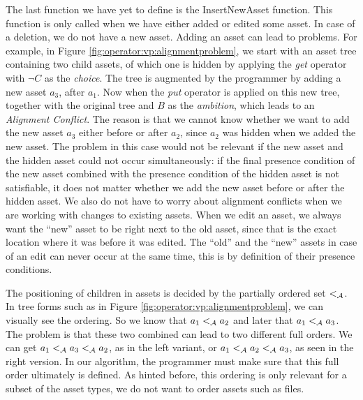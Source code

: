 The last function we have yet to define is the {\sc InsertNewAsset} function.
This function is only called when we have either added or edited some asset. In
case of a deletion, we do not have a new asset. Adding an asset can lead to 
problems. For example, in Figure \ref{fig:operator:vp:alignmentproblem}, we start
with an asset tree containing two child assets, of which one
is hidden by applying the \emph{get} operator with $\neg C$ as the
\emph{choice}. The tree is augmented by the programmer by adding a new asset
$a_3$, after $a_1$. Now when the \emph{put} operator is applied on this new
tree, together with the original tree and $B$ as the \emph{ambition}, which leads
to an \emph{Alignment Conflict}. The reason is that we cannot know whether we
want to add the new asset $a_3$ either before or after $a_2$, since $a_2$ was
hidden when we added the new asset. The problem in this case would not be
relevant if the new asset and the hidden asset could not occur simultaneously:
if the final presence condition of the new asset combined with the presence
condition of the hidden asset is not satisfiable, it does not matter whether we
add the new asset before or after the hidden asset. We also do not have to
worry about alignment conflicts when we are working with changes to existing
assets. When we edit an asset, we always want the ``new'' asset to be right
next to the old asset, since that is the exact location where it was before it
was edited. The ``old'' and the ``new'' assets in case of an edit can never
occur at the same time, this is by definition of their presence conditions.

The positioning of children in assets is decided by the partially ordered set
$<_{\mathcal{A}}$. In tree forms such as in Figure
\ref{fig:operator:vp:alignmentproblem}, we can visually see the ordering. So we
know that \(a_1 <_{\mathcal{A}} a_2\) and later that
\(a_1 <_{\mathcal{A}} a_3\). The problem is that these two combined can lead
to two different full orders. We can get \(a_1 <_{\mathcal{A}} a_3
<_{\mathcal{A}} a_2\), as in the left variant, or \(a_1 <_{\mathcal{A}}
a_2 <_{\mathcal{A}} a_3\), as seen in the right version. In our algorithm,
the programmer must make sure that this full order ultimately is defined. As
hinted before, this ordering is only relevant for a subset of the asset 
types, we do not want to order assets such as files. 

